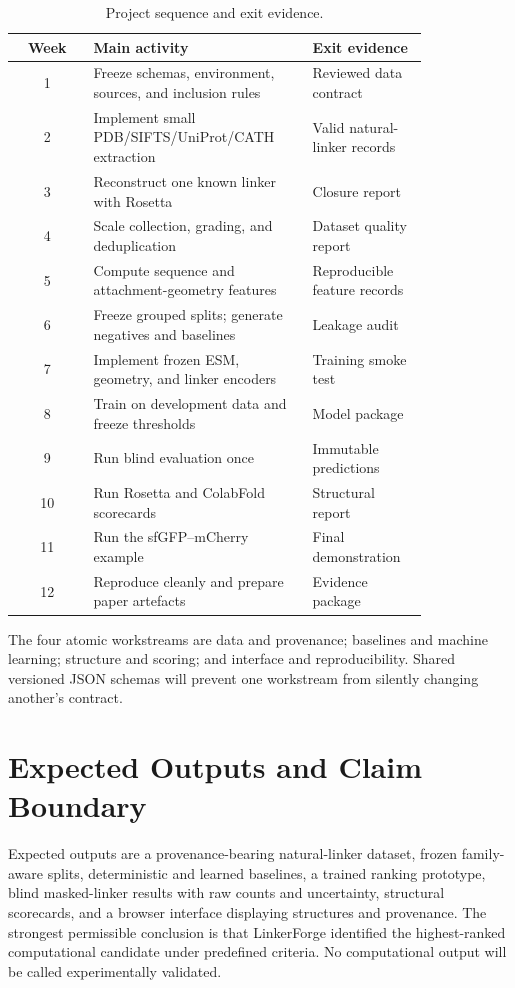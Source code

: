 \documentclass[10pt,a4paper]{article}
\begin{document}
\begin{table}[h]
  \caption{Project sequence and exit evidence.}
  \label{tab:plan}
  \centering
  \small
  \begin{tabular}{c p{0.53\linewidth} p{0.29\linewidth}}
    \toprule
    Week & Main activity & Exit evidence \\
    \midrule
    1 & Freeze schemas, environment, sources, and inclusion rules & Reviewed data contract \\
    2 & Implement small PDB/SIFTS/UniProt/CATH extraction & Valid natural-linker records \\
    3 & Reconstruct one known linker with Rosetta & Closure report \\
    4 & Scale collection, grading, and deduplication & Dataset quality report \\
    5 & Compute sequence and attachment-geometry features & Reproducible feature records \\
    6 & Freeze grouped splits; generate negatives and baselines & Leakage audit \\
    7 & Implement frozen ESM, geometry, and linker encoders & Training smoke test \\
    8 & Train on development data and freeze thresholds & Model package \\
    9 & Run blind evaluation once & Immutable predictions \\
    10 & Run Rosetta and ColabFold scorecards & Structural report \\
    11 & Run the sfGFP--mCherry example & Final demonstration \\
    12 & Reproduce cleanly and prepare paper artefacts & Evidence package \\
    \bottomrule
  \end{tabular}
\end{table}

The four atomic workstreams are data and provenance; baselines and machine learning; structure and scoring; and interface and reproducibility. Shared versioned JSON schemas will prevent one workstream from silently changing another's contract.

\section{Expected Outputs and Claim Boundary}

Expected outputs are a provenance-bearing natural-linker dataset, frozen family-aware splits, deterministic and learned baselines, a trained ranking prototype, blind masked-linker results with raw counts and uncertainty, structural scorecards, and a browser interface displaying structures and provenance. The strongest permissible conclusion is that LinkerForge identified the highest-ranked computational candidate under predefined criteria. No computational output will be called experimentally validated.
\end{document}
